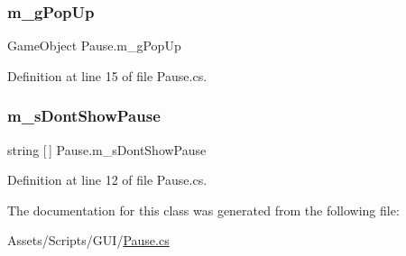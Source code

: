 \mbox{\label{class_pause_ae1a91e785fbb89c67a02bff889e8f10d}} 
\subsubsection{\texorpdfstring{m\+\_\+g\+Pop\+Up}{m\_gPopUp}}
{\footnotesize\ttfamily Game\+Object Pause.\+m\+\_\+g\+Pop\+Up}



Definition at line 15 of file Pause.\+cs.

\mbox{\label{class_pause_accb3db9595822bc864e2cc3efb919316}} 
\subsubsection{\texorpdfstring{m\+\_\+s\+Dont\+Show\+Pause}{m\_sDontShowPause}}
{\footnotesize\ttfamily string \mbox{[}$\,$\mbox{]} Pause.\+m\+\_\+s\+Dont\+Show\+Pause}



Definition at line 12 of file Pause.\+cs.



The documentation for this class was generated from the following file\+:\begin{DoxyCompactItemize}
\item 
Assets/\+Scripts/\+G\+U\+I/\mbox{\hyperlink{_pause_8cs}{Pause.\+cs}}\end{DoxyCompactItemize}
